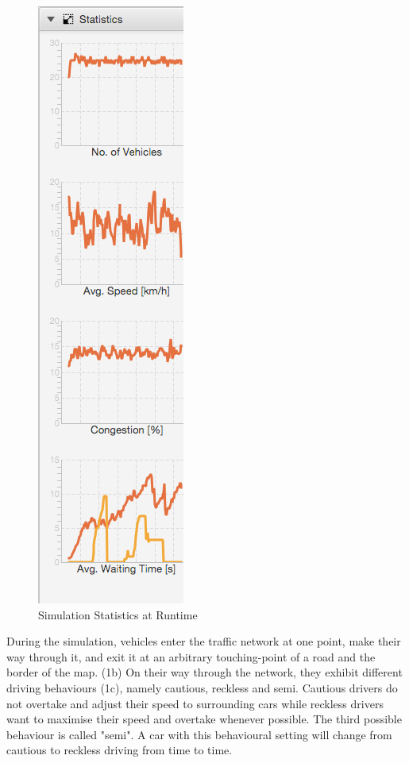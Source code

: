 \begin{figure}
	\begin{center}
		\includegraphics[scale=0.5]{img/graphs.png}
		\caption[Simulation Statistics at Runtime]{Simulation Statistics at Runtime}
		\label{fig:graphs}
	\end{center}
\end{figure}

During the simulation, vehicles enter the traffic network at one point, make their way through it, and exit it at an arbitrary touching-point of a road and the border of the map. (1b) On their way through the network, they exhibit different driving behaviours (1c), namely cautious, reckless and semi. Cautious drivers do not overtake and adjust their speed to surrounding cars while reckless drivers want to maximise their speed and overtake whenever possible. The third possible behaviour is called "semi". A car with this behavioural setting will change from cautious to reckless driving from time to time.

